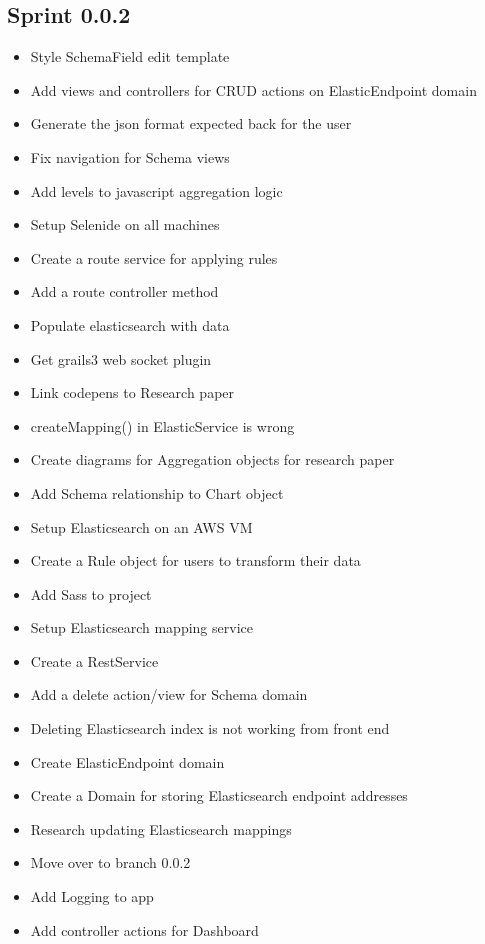\documentclass[12pt]{report}
\begin{document}
\subsection*{Sprint 0.0.2}
\begin{itemize}
\item Style SchemaField edit template
\item Add views and controllers for CRUD actions on ElasticEndpoint domain
\item Generate the json format expected back for the user
\item Fix navigation for Schema views
\item Add levels to javascript aggregation logic
\item Setup Selenide on all machines
\item Create a route service for applying rules
\item Add a route controller method
\item Populate elasticsearch with data
\item Get grails3 web socket plugin
\item Link codepens to Research paper
\item createMapping() in ElasticService is wrong
\item Create diagrams for Aggregation objects for research paper
\item Add Schema relationship to Chart object
\item Setup Elasticsearch on an AWS VM
\item Create a Rule object for users to transform their data
\item Add Sass to project
\item Setup Elasticsearch mapping service
\item Create a RestService
\item Add a delete action/view for Schema domain
\item Deleting Elasticsearch index is not working from front end
\item Create ElasticEndpoint domain
\item Create a Domain for storing Elasticsearch endpoint addresses
\item Research updating Elasticsearch mappings
\item Move over to branch 0.0.2
\item Add Logging to app
\item Add controller actions for Dashboard
\end{itemize}
\end{document}
